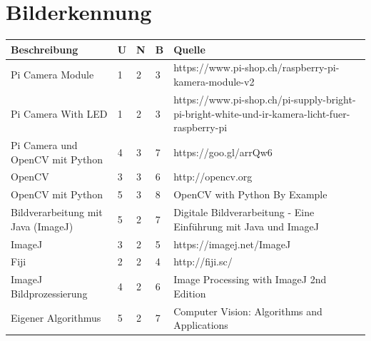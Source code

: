 \documentclass[a4paper]{report}
\begin{document}
\section{Bilderkennung}
\label{app:sec:Bilderk}
\vspace{1em}
\noindent
\begin{tabular}{|p{}|p{}|p{}|p{}|p{}|}
	\hline
	\textbf{Beschreibung} & \textbf{U} & \textbf{N} & \textbf{B} & \textbf{Quelle} \\
	\hline
	Pi Camera Module & 1 & 2 & 3 & https://www.pi-shop.ch/raspberry-pi-kamera-module-v2\\
	\hline
	Pi Camera With LED & 1 & 2 & 3 & https://www.pi-shop.ch/pi-supply-bright-pi-bright-white-und-ir-kamera-licht-fuer-raspberry-pi\\
	\hline
	Pi Camera und OpenCV mit Python & 4 & 3 & 7 & https://goo.gl/arrQw6 \\
	\hline
	OpenCV & 3 & 3 & 6 & http://opencv.org \\
	\hline
	OpenCV mit Python & 5 & 3 & 8 & OpenCV with Python By Example \\
	\hline
	Bildverarbeitung mit Java (ImageJ) & 5 & 2 & 7 & Digitale Bildverarbeitung - Eine Einführung mit Java und ImageJ\\
	\hline
	ImageJ & 3 & 2 & 5 & https://imagej.net/ImageJ \\
	\hline
	Fiji & 2 & 2 & 4 & http://fiji.sc/ \\
	\hline
	ImageJ Bildprozessierung & 4 & 2 & 6 & Image Processing with ImageJ 2nd Edition \\
	\hline
	Eigener Algorithmus & 5 & 2 & 7 & Computer Vision: Algorithms and Applications\\
	\hline
\end{tabular}
\end{document}
